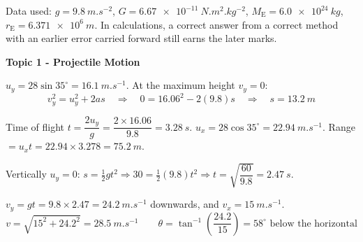 \documentclass[12pt]{article}
\newcommand\anstopic[1]{\par\Needspace{8\baselineskip}\vspace{4mm}%
  \begin{center}{\headfont\bfseries\fontsize{14}{18}\selectfont #1\par}\end{center}\vspace{2pt}}
\begin{document}

Data used: $g = \qty{9.8}{m.s^{-2}}$, $G = \qty{6.67e-11}{N.m^2.kg^{-2}}$,
$M_\mathrm{E} = \qty{6.0e24}{kg}$, $r_\mathrm{E} = \qty{6.371e6}{m}$. In calculations, a correct
answer from a correct method with an earlier error carried forward still earns the later marks.

\anstopic{Topic 1 - Projectile Motion}

\ansq
{}
\begin{crit}
\end{crit}
\sample
$u_y = 28\sin 35^\circ = \qty{16.1}{m.s^{-1}}$. At the maximum height $v_y = 0$:
\[ v_y^2 = u_y^2 + 2as \quad\Rightarrow\quad 0 = 16.06^2 - 2(9.8)s \quad\Rightarrow\quad s = \qty{13.2}{m} \]
\begin{crit}
\end{crit}
\sample
Time of flight $t = \dfrac{2u_y}{g} = \dfrac{2 \times 16.06}{9.8} = \qty{3.28}{s}$.
$u_x = 28\cos 35^\circ = \qty{22.94}{m.s^{-1}}$. Range $= u_x t = 22.94 \times 3.278 = \qty{75.2}{m}$.

\ansq
{}
\begin{crit}
\end{crit}
\sample
Vertically $u_y = 0$: $s = \frac{1}{2}gt^2 \Rightarrow 30 = \frac{1}{2}(9.8)t^2 \Rightarrow
t = \sqrt{\dfrac{60}{9.8}} = \qty{2.47}{s}$.
\begin{crit}
\end{crit}
\sample
$v_y = gt = 9.8 \times 2.47 = \qty{24.2}{m.s^{-1}}$ downwards, and $v_x = \qty{15}{m.s^{-1}}$.
\[ v = \sqrt{15^2 + 24.2^2} = \qty{28.5}{m.s^{-1}} \qquad
   \theta = \tan^{-1}\!\left(\frac{24.2}{15}\right) = 58^\circ \text{ below the horizontal} \]
\end{document}
